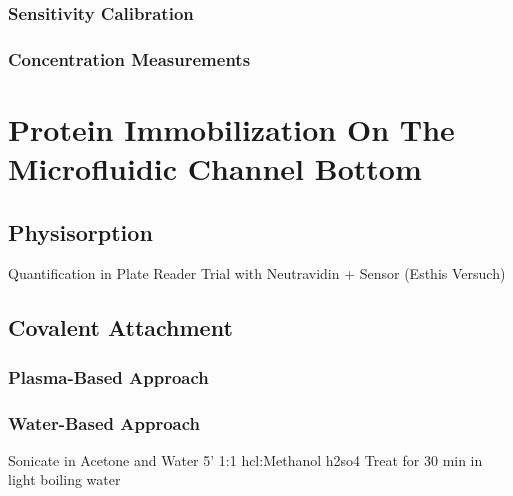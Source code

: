 \subsubsection{Sensitivity Calibration}

\subsubsection{Concentration Measurements}
\cleardoubleemptypage

\section{Protein Immobilization On The Microfluidic Channel Bottom}

\subsection{Physisorption}
Quantification in Plate Reader
Trial with Neutravidin + Sensor (Esthis Versuch)
\clearpage

\subsection{Covalent Attachment}
\clearpage

\subsubsection{Plasma-Based Approach}

\subsubsection{Water-Based Approach}
Sonicate in Acetone and Water 5'
1:1 \gls{hcl}:Methanol
\gls{h2so4}
Treat for 30 min in light boiling water